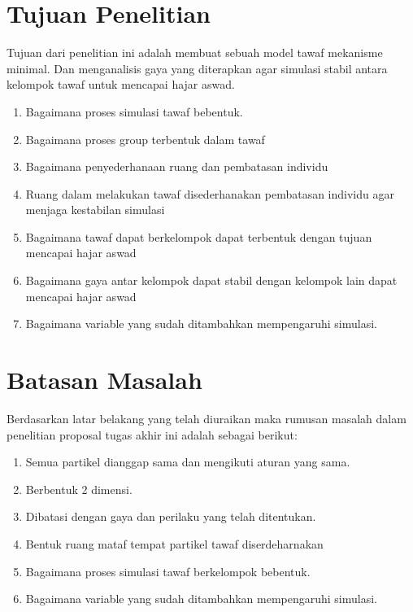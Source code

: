 \section{Tujuan Penelitian}\label{sec:tujuan}
\hspace{0.6cm}Tujuan dari penelitian ini adalah membuat sebuah model tawaf mekanisme minimal. Dan menganalisis gaya yang diterapkan agar simulasi stabil antara kelompok tawaf untuk mencapai hajar aswad.

\begin{enumerate}
\item{Bagaimana proses simulasi tawaf bebentuk.}
\item{Bagaimana proses group terbentuk dalam tawaf}
\item{Bagaimana penyederhanaan ruang dan pembatasan individu}
\item{Ruang dalam melakukan tawaf disederhanakan pembatasan individu agar menjaga kestabilan simulasi}
\item{Bagaimana tawaf dapat berkelompok dapat terbentuk dengan tujuan mencapai hajar aswad}
\item{Bagaimana gaya antar kelompok dapat stabil dengan kelompok lain dapat mencapai hajar aswad}
\item{Bagaimana variable yang sudah ditambahkan mempengaruhi simulasi.}
\end{enumerate}

\section{Batasan Masalah}\label{sec:batasan}
Berdasarkan latar belakang yang telah diuraikan maka rumusan masalah dalam penelitian proposal tugas akhir ini adalah sebagai berikut:
\begin{enumerate} 
\item{Semua partikel dianggap sama dan mengikuti aturan yang sama.} 
\item{Berbentuk 2 dimensi.} 
\item{Dibatasi dengan gaya dan perilaku yang telah ditentukan.} 
\item{Bentuk ruang mataf tempat partikel tawaf diserdeharnakan}
\item{Bagaimana proses simulasi tawaf berkelompok  bebentuk.} 
\item{Bagaimana variable yang sudah ditambahkan mempengaruhi simulasi.}
\end{enumerate}


